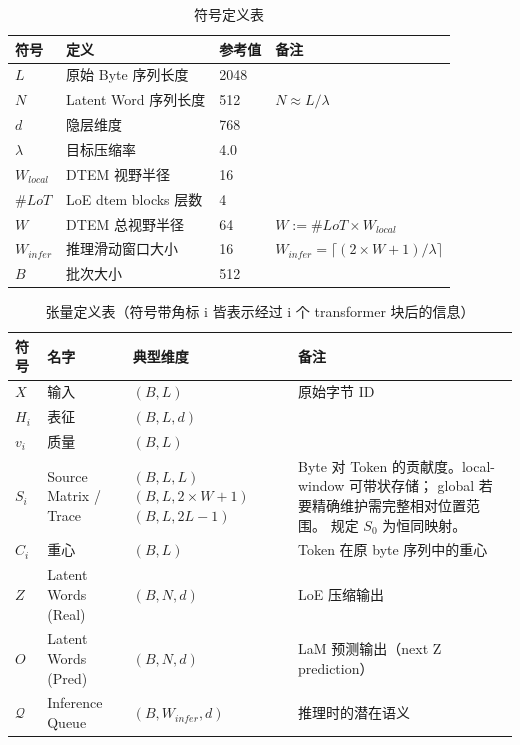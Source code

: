 \documentclass[a4paper,11pt]{article}
\begin{document}
\begin{table}[h]
\centering
\caption{符号定义表}
\begin{tabular}{l l l l}
\toprule
\textbf{符号} & \textbf{定义} & \textbf{参考值} & \textbf{备注} \\
\midrule
$L$ & 原始 Byte 序列长度 & 2048 &  \\
$N$ & Latent Word 序列长度 & 512 & $N \approx L/\lambda$ \\
$d$ & 隐层维度 & 768 & \\
$\lambda$ & 目标压缩率 & 4.0 &  \\
$W_{local}$ & DTEM 视野半径 & 16 &  \\
$\#LoT$ & LoE dtem blocks 层数 & 4 & \\
$W$ & DTEM 总视野半径 & 64 & $W:=\#LoT \times W_{local}$ \\
$W_{infer}$ & 推理滑动窗口大小 & 16 & $W_{infer}=\lceil (2\times W+1)/\lambda\rceil$ \\
$B$&批次大小&512&\\
\bottomrule
\end{tabular}
\end{table}

\begin{table}[h]
\centering
\caption{张量定义表（符号带角标 i 皆表示经过 i 个 transformer 块后的信息）}
\begin{tabular}{l l p{4cm} p{6cm}}
\toprule
\textbf{符号} & \textbf{名字} & \textbf{典型维度 \color{red}{存储维度}} & \textbf{备注} \\
\midrule
$X$ & 输入 & $(B, L)$ & 原始字节 ID \\
$H_i$ & 表征 & $(B,L,d)$ &  \\
$v_i$ & 质量 & $(B,L)$ & \\
$S_i$ & Source Matrix / Trace & \makecell[l]{$(B,L,L)$\\ \color{red}{local: }$(B,L,2\times W+1)$\\ \color{red}{global: }$(B,L,2L-1)$} & \makecell[l]{Byte 对 Token 的贡献度。local-window 可带状存储；\\ global 若要精确维护需完整相对位置范围。\\ 规定 $S_0$ 为恒同映射。} \\[-1.5ex]
$C_i$ & 重心 & $(B, L)$ & Token 在原 byte 序列中的重心 \\
$Z$ & Latent Words (Real) & $(B,N,d)$ & LoE 压缩输出\\
$O$ & Latent Words (Pred) & $(B,N,d)$ & LaM 预测输出（next Z prediction） \\
$\mathcal{Q}$ & Inference Queue & $(B, W_{infer}, d)$ & 推理时的潜在语义 \\
\bottomrule
\end{tabular}
\end{table}
\end{document}
